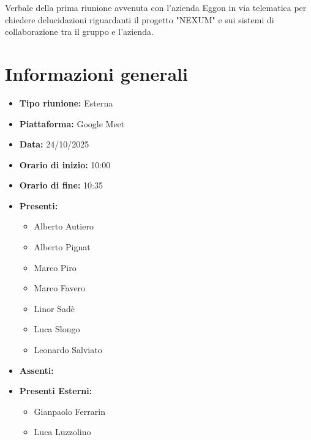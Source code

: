 \documentclass[a4paper,12pt]{article}
\begin{document}
\vspace{0.5cm}

\begin{center}
\begin{tcolorbox}[colback=secondaryblue!10,colframe=secondaryblue,width=0.9\textwidth,arc=3mm,boxrule=0.8pt,title={\bfseries Abstract}]
Verbale della prima riunione avvenuta con l'azienda Eggon in via telematica per chiedere delucidazioni riguardanti il progetto "NEXUM" e sui sistemi di collaborazione tra il gruppo e l'azienda.
\end{tcolorbox}
\end{center}

\newpage

\tableofcontents
\newpage


\section{Informazioni generali}

\begin{itemize}
    \item \textbf{Tipo riunione:} Esterna
    \item \textbf{Piattaforma:} Google Meet
    \item \textbf{Data:} 24/10/2025
    \item \textbf{Orario di inizio:} 10:00
    \item \textbf{Orario di fine:} 10:35
    \item \textbf{Presenti:}
    \begin{itemize}[leftmargin=1.5em, itemsep=3pt, label={\rule[0.5ex]{0.4em}{0.4em}}]
        \item Alberto Autiero
        \item Alberto Pignat
        \item Marco Piro
        \item Marco Favero
        \item Linor Sadè
        \item Luca Slongo
        \item Leonardo Salviato
    \end{itemize}
    \item \textbf{Assenti:}
    \item \textbf{Presenti Esterni:}
    \begin{itemize}[leftmargin=1.5em, itemsep=3pt, label={\rule[0.5ex]{0.4em}{0.4em}}]
        \item Gianpaolo Ferrarin
        \item Luca Luzzolino
    \end{itemize}

\end{itemize}
\end{document}

